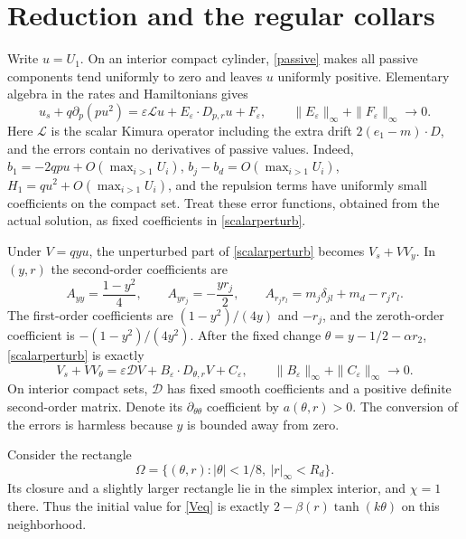 \documentclass[11pt]{article}
\begin{document}
\section{Reduction and the regular collars}
Write $u=U_1$. On an interior compact cylinder, \eqref{passive} makes all passive components tend uniformly to zero and leaves $u$ uniformly positive. Elementary algebra in the rates and Hamiltonians gives
\begin{equation}\label{scalarperturb}
 u_s+q\partial_p(pu^2)
 =\varepsilon\mathcal L u+E_\varepsilon\cdot D_{p,r}u+F_\varepsilon,
 \qquad \|E_\varepsilon\|_\infty+\|F_\varepsilon\|_\infty\longrightarrow0.
\end{equation}
Here $\mathcal L$ is the scalar Kimura operator including the extra drift $2(e_1-m)\cdot D$, and the errors contain no derivatives of passive values. Indeed,
$b_1=-2qpu+O(\max_{i>1}U_i)$, $b_j-b_d=O(\max_{i>1}U_i)$, $H_1=qu^2+O(\max_{i>1}U_i)$, and the repulsion terms have uniformly small coefficients on the compact set. Treat these error functions, obtained from the actual solution, as fixed coefficients in \eqref{scalarperturb}.

Under $V=qyu$, the unperturbed part of \eqref{scalarperturb} becomes $V_s+VV_y$. In $(y,r)$ the second-order coefficients are
\begin{equation}\label{coefficients}
 A_{yy}=\frac{1-y^2}{4},\qquad A_{yr_j}=-\frac{yr_j}{2},\qquad
 A_{r_jr_l}=m_j\delta_{jl}+m_d-r_jr_l.
\end{equation}
The first-order coefficients are $(1-y^2)/(4y)$ and $-r_j$, and the zeroth-order coefficient is $-(1-y^2)/(4y^2)$. After the fixed change $\theta=y-1/2-\alpha r_2$, \eqref{scalarperturb} is exactly
\begin{equation}\label{Veq}
 V_s+VV_\theta=\varepsilon\mathcal D V+B_\varepsilon\cdot D_{\theta,r}V+C_\varepsilon,
 \qquad \|B_\varepsilon\|_\infty+\|C_\varepsilon\|_\infty\longrightarrow0.
\end{equation}
On interior compact sets, $\mathcal D$ has fixed smooth coefficients and a positive definite second-order matrix. Denote its $\partial_{\theta\theta}$ coefficient by $a(\theta,r)>0$. The conversion of the errors is harmless because $y$ is bounded away from zero.

Consider the rectangle
\[
 \Omega=\{(\theta,r):|\theta|<1/8,\ |r|_\infty<R_d\}.
\]
Its closure and a slightly larger rectangle lie in the simplex interior, and $\chi=1$ there. Thus the initial value for \eqref{Veq} is exactly $2-\beta(r)\tanh(k\theta)$ on this neighborhood.
\end{document}

